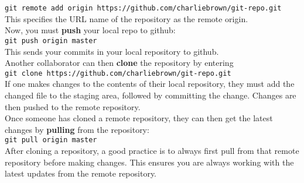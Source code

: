 \documentclass[11pt]{article}
\begin{document}
{\tt git remote add origin https://github.com/charliebrown/git-repo.git} \\

\noindent
This specifies the {\small URL} name of the repository as the remote origin. \\

\noindent
Now, you must {\bf push} your local repo to github: \\

{\tt git push origin master} \\

\noindent
This sends your commits in your local repository to github. \\

\noindent
Another collaborator can then {\bf clone} the repository by entering \\

{\tt git clone https://github.com/charliebrown/git-repo.git} \\

\noindent
If one makes changes to the contents of their local repository, they must add the changed file to the staging area, followed by committing the change. Changes are then pushed to the remote repository. \\

\noindent
Once someone has cloned a remote repository, they can then get the latest changes by {\bf pulling} from the repository: \\

{\tt git pull origin master} \\

\noindent
After cloning a repository, a good practice is to always first pull from that remote repository before making changes. This ensures you are always working with the latest updates from the remote repository. \\
\end{document}
